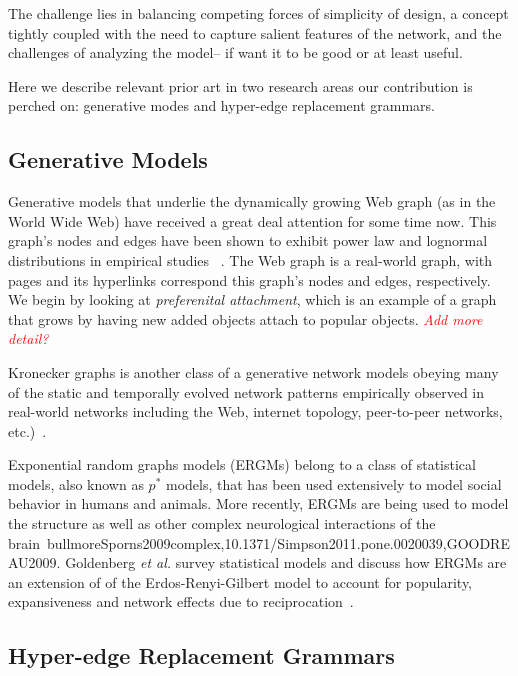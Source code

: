 The challenge lies in balancing competing forces of simplicity of design, a concept tightly coupled with the need to capture salient features of the network, and the challenges of analyzing the model-- if want it to be good or at least useful.

Here we describe relevant prior art in two research areas our contribution is perched on: generative modes and hyper-edge replacement grammars.

\subsection{Generative Models}
Generative models that underlie the dynamically growing Web graph (as in the World Wide Web) have received a great deal attention for some time now. This graph's nodes and edges have been shown to exhibit power law and lognormal distributions in empirical studies ~\cite{mitzenmacher2004brief, few}.  The Web graph is a real-world graph, with pages and its hyperlinks correspond this graph's nodes and edges, respectively.  We begin by looking at \textit{preferenital attachment}, which is an example of a graph that grows by having new added objects attach to popular objects. \textcolor{red}{\em Add more detail?} %

Kronecker graphs is another class of a generative network models obeying many of the static and temporally evolved network patterns empirically observed in real-world networks including the Web, internet topology, peer-to-peer networks, etc.)~\cite{Kepner_Gilbert.ch9_leskovec_2011,leskovec2010,many}.  

Exponential random graphs models (ERGMs) belong to a class of statistical models, also known as $p^*$ models, that has been used extensively to model social behavior in humans and animals. More recently, ERGMs are being used to model the structure as well as other complex neurological interactions of the brain~{bullmoreSporns2009complex,10.1371/Simpson2011.pone.0020039,GOODREAU2009}. Goldenberg {\em et al.} survey statistical models and discuss how ERGMs are an extension of of the Erdos-Renyi-Gilbert model to account for popularity, expansiveness and network effects due to reciprocation~\cite{goldenberg2010survey,PhysRevE.88.032810}.





\subsection{Hyper-edge Replacement Grammars}